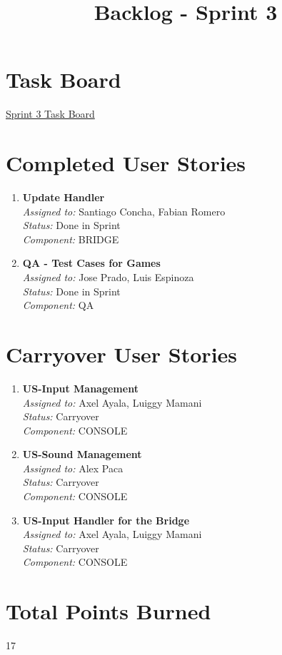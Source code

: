 \documentclass{article}
\begin{document}
    \title{Backlog - Sprint 3}
    \author{}
    \date{}
    \maketitle

    \section*{Task Board}
    \href{https://tree.taiga.io/project/joseluis-teran-coffeetime/taskboard/sprint-3}{Sprint 3 Task Board}

    \section*{Completed User Stories}

    \begin{enumerate}
        \item \textbf{Update Handler} \\
        \textit{Assigned to:} Santiago Concha, Fabian Romero \\
        \textit{Status:} Done in Sprint \\
        \textit{Component:} BRIDGE
        \item \textbf{QA - Test Cases for Games} \\
        \textit{Assigned to:} Jose Prado, Luis Espinoza \\
        \textit{Status:} Done in Sprint \\
        \textit{Component:} QA
    \end{enumerate}

    \section*{Carryover User Stories}

    \begin{enumerate}
        \item \textbf{US-Input Management} \\
        \textit{Assigned to:} Axel Ayala, Luiggy Mamani \\
        \textit{Status:} Carryover \\
        \textit{Component:} CONSOLE
        \item \textbf{US-Sound Management} \\
        \textit{Assigned to:} Alex Paca \\
        \textit{Status:} Carryover \\
        \textit{Component:} CONSOLE
        \item \textbf{US-Input Handler for the Bridge} \\
        \textit{Assigned to:} Axel Ayala, Luiggy Mamani \\
        \textit{Status:} Carryover \\
        \textit{Component:} CONSOLE
    \end{enumerate}

    \section*{Total Points Burned}
    17
\end{document}
